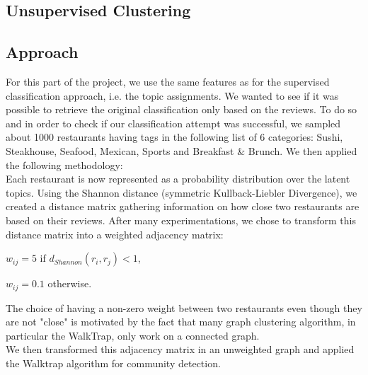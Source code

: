 \documentclass[twoside]{article}
\begin{document}
\begin{multicols}{2}
\section{Unsupervised Clustering}
\subsection{Approach}

For this part of the project, we use the same features as for the supervised classification approach, i.e. the topic assignments. We wanted to see if it was possible to retrieve the original classification only based on the reviews. To do so and in order to check if our classification attempt was successful, we sampled about 1000 restaurants having tags in the following list of 6 categories: Sushi, Steakhouse, Seafood, Mexican, Sports and Breakfast \& Brunch. We then applied the following methodology:\\

Each restaurant is now represented as a probability distribution over the latent topics. Using the Shannon distance (symmetric Kullback-Liebler Divergence), we created a distance matrix gathering information on how close two restaurants are based on their reviews. After many experimentations, we chose to transform this distance matrix into a weighted adjacency matrix:\\

\begin{compactitem}
\item $w_{ij} = 5$ if $d_{Shannon}(r_i,r_j)<1$,
\item $w_{ij} = 0.1$ otherwise.\\
\end{compactitem}

\noindent The choice of having a non-zero weight between two restaurants even though they are not "close" is motivated by the fact that many graph clustering algorithm, in particular the WalkTrap, only work on a connected graph.\\

\noindent We then transformed this adjacency matrix in an unweighted graph and applied the Walktrap algorithm for community detection.\\


\end{multicols}
\end{document}
